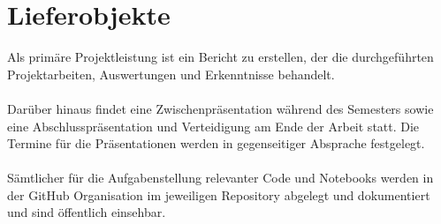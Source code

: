 \section{Lieferobjekte}
Als primäre Projektleistung ist ein Bericht zu erstellen, der die durchgeführten Projektarbeiten, Auswertungen und Erkenntnisse behandelt. \\\\
Darüber hinaus findet eine Zwischenpräsentation während des Semesters sowie eine Abschlusspräsentation und Verteidigung am Ende der Arbeit statt. Die Termine für die Präsentationen werden in gegenseitiger Absprache festgelegt. \\\\
Sämtlicher für die Aufgabenstellung relevanter Code und Notebooks werden in der GitHub Organisation im jeweiligen Repository abgelegt und dokumentiert und sind öffentlich einsehbar.




